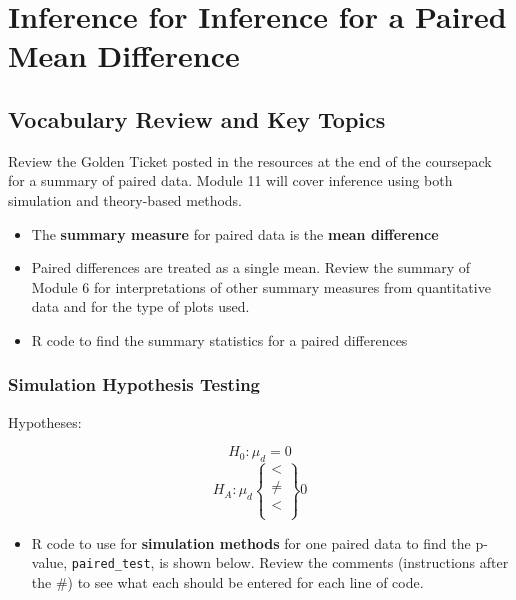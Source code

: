 \documentclass[
]{report}
\providecommand{\tightlist}{%
  \setlength{\itemsep}{0pt}\setlength{\parskip}{0pt}}
\begin{document}
\newpage

\chapter{Inference for Inference for a Paired Mean Difference}\label{inference-for-inference-for-a-paired-mean-difference}

\section{Vocabulary Review and Key Topics}\label{vocabulary-review-and-key-topics-8}

Review the Golden Ticket posted in the resources at the end of the coursepack for a summary of paired data. Module 11 will cover inference using both simulation and theory-based methods.

\begin{itemize}
\item
  The \textbf{summary measure} for paired data is the \textbf{mean difference}
\item
  Paired differences are treated as a single mean. Review the summary of Module 6 for interpretations of other summary measures from quantitative data and for the type of plots used.
\item
  R code to find the summary statistics for a paired differences
\end{itemize}

\subsection*{Simulation Hypothesis Testing}\label{simulation-hypothesis-testing}

Hypotheses:

\[H_0: \mu_d = 0\]
\[H_A: \mu_d\left\{
\begin{array}{ll}
< \\
\ne \\
< \\
\end{array}
\right\}
0 \]

\begin{itemize}
\tightlist
\item
  R code to use for \textbf{simulation methods} for one paired data to find the p-value, \texttt{paired\_test}, is shown below. Review the comments (instructions after the \#) to see what each should be entered for each line of code.
\end{itemize}
\end{document}
